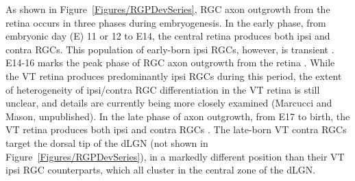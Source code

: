 As shown in Figure~\ref{Figures/RGPDevSeries}, RGC axon outgrowth from the retina occurs in three phases during embryogenesis.
In the early phase, from embryonic day (E) 11 or 12 to E14, the central retina produces both ipsi and contra RGCs.
This population of early-born ipsi RGCs, however, is transient \cite{drager1985birth,colello1990early,soares2015transient}.
E14-16 marks the peak phase of RGC axon outgrowth from the retina \cite{drager1985birth,petros2008retinal}.
While the VT retina produces predominantly ipsi RGCs during this period, the extent of heterogeneity of ipsi/contra RGC differentiation in the VT retina is still unclear, and details are currently being more closely examined (Marcucci and Mason, unpublished).
In the late phase of axon outgrowth, from E17 to birth, the VT retina produces both ipsi and contra RGCs \cite{drager1985birth,petros2008retinal}.
The late-born VT contra RGCs target the dorsal tip of the dLGN (not shown in Figure~\ref{Figures/RGPDevSeries}), in a markedly different position than their VT ipsi RGC counterparts, which all cluster in the central zone of the dLGN.